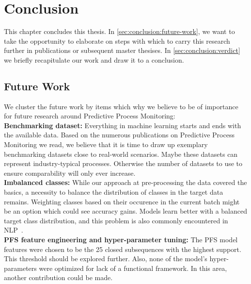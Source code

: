 \chapter{Conclusion} \label{chap:conclusion}
This chapter concludes this thesis. In \autoref{sec:conclusion:future-work}, we want to take the opportunity to elaborate on steps with which to carry this research further in publications or subsequent master thesises. In \autoref{sec:conclusion:verdict} we briefly recapitulate our work and draw it to a conclusion.

\section{Future Work} \label{sec:conclusion:future-work}
We cluster the future work by items which why we believe to be of importance for future research around Predictive Process Monitoring:\\

\noindent\textbf{Benchmarking dataset:} Everything in machine learning starts and ends with the available data. Based on the numerous publications on Predictive Process Monitoring we read, we believe that it is time to draw up exemplary benchmarking datasets close to real-world scenarios. Maybe these datasets can represent industry-typical processes. Otherwise the number of datasets to use to ensure comparability will only ever increase.\\

\noindent\textbf{Imbalanced classes:} While our approach at pre-processing the data covered the basics, a necessity to balance the distribution of classes in the target data remains. Weighting classes based on their occurence in the current batch might be an option which could see accuracy gains. Models learn better with a balanced target class distribution, and this problem is also commonly encountered in NLP~\cite{web:stackoverflow-keras-class-weights}.\\

\noindent\textbf{PFS feature engineering and hyper-parameter tuning:} The PFS model features  were chosen to be the 25 closed subsequences with the highest support. This threshold should be explored further. Also, none of the model's hyper-parameters were optimized for lack of a functional framework. In this area, another contribution could be made.\\


